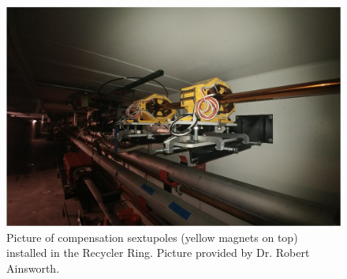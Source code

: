 \begin{figure}[H]
   \centering
   \includegraphics[width=\columnwidth]{chapter3/sextupoles.png}
   \caption{Picture of compensation sextupoles (yellow magnets on top) installed in the Recycler Ring. Picture provided by Dr. Robert Ainsworth.}
   \label{fig:sextupoles}
\end{figure}